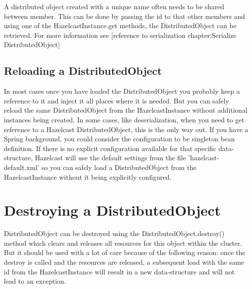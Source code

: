 A distributed object created with a unique name often needs to be shared between member. This can be done by passing the id to that other members and using one of the HazelcastInstance.get methods, the DistributedObject can be retrieved. For more information see [reference to serialization chapter:Serialize DistributedObject]

\subsection{Reloading a DistributedObject}
In most cases once you have loaded the DistributedObject you probably keep a reference to it and inject it all places where it is needed. But you can safely reload the same DistributedObject from the HazelcastInstance without additional instances being created. In some cases, like deserialization, when you need to get reference to a Hazelcast DistributedObject, this is the only way out. If you have a Spring background, you could consider the configuration to be singleton bean definition. If there is no explicit configuration available for that specific data-structure, Hazelcast will use the default settings from the file 'hazelcast-default.xml' so you can safely load a DistributedObject from the HazelcastInstance without it being explicitly configured.

\section{Destroying a DistributedObject}
DistributedObject can be destroyed using the DistributedObject.destroy() method which clears and releases all resources for this object within the cluster. But it should be used with a lot of care because of the following reason: once the destroy is called and the resources are released, a subsequent load with the same id from the HazelcastInstance will result in a new data-structure and will not lead to an exception. 

